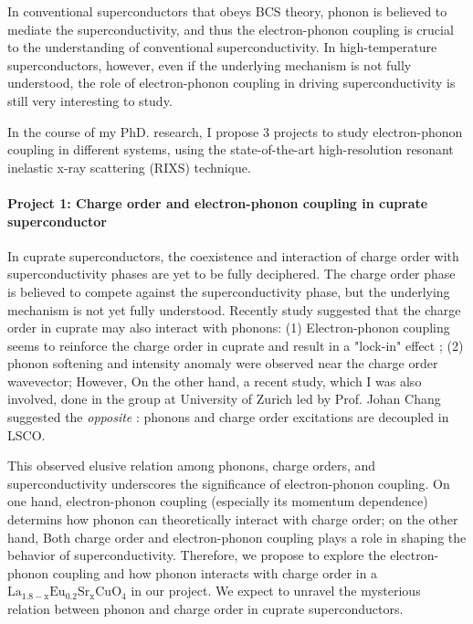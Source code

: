 \documentclass[11pt]{article}
\begin{document}
In conventional superconductors that obeys BCS theory, phonon is believed to mediate  the superconductivity\cite{bardeen_theory_1957}, and thus the electron-phonon coupling is crucial to the understanding of conventional superconductivity. In high-temperature superconductors, however, even if the underlying mechanism is not fully understood, the role of electron-phonon coupling in driving superconductivity is still very interesting to study.

In the course of my PhD. research, I propose 3 projects to study electron-phonon coupling in different systems, using the state-of-the-art high-resolution resonant inelastic x-ray scattering (RIXS) technique\cite{ament_resonant_2011,zhou_i21_2022}. 

\paragraph{Project 1: Charge order and electron-phonon coupling in cuprate superconductor}
In cuprate superconductors, the coexistence and interaction of charge order with superconductivity phases are yet to be fully deciphered. The charge order phase is believed to compete against the superconductivity phase\cite{arpaia_charge_2021,comin_resonant_2016,canosa_resonant_2014, hucker_competing_2014, chang_direct_2012,ghiringhelli_long-range_2012}, but the underlying mechanism is not yet fully understood. Recently study suggested that the charge order in cuprate may also interact with phonons: (1) Electron-phonon coupling seems to reinforce the charge order in cuprate and result in a "lock-in" effect \cite{wang_charge_2021}; (2) phonon softening and intensity anomaly were observed near the charge order wavevector\cite{wang_charge_2021,lin_strongly_2020, huang_quantum_2021,miao_incommensurate_2018,tacon_inelastic_2014,li_multiorbital_2020,braicovich_determining_2020,chaix_dispersive_2017,peng_enhanced_2020};  However, On the other hand, a recent study, which I was also involved, done in the group at University of Zurich led by Prof. Johan Chang suggested the \textit{opposite} : phonons and charge order excitations are decoupled in LSCO.

This observed elusive relation among phonons, charge orders, and superconductivity underscores the significance of electron-phonon coupling. On one hand, electron-phonon coupling (especially its momentum dependence) determins how phonon can theoretically interact with charge order; on the other hand, Both charge order and electron-phonon coupling plays a role in shaping the behavior of superconductivity. Therefore, we propose to explore the electron-phonon coupling and how phonon interacts with charge order in a $\mathrm{La_{1.8-x}Eu_{0.2}Sr_xCuO_{4}}$ in our project. We expect to unravel the mysterious relation between phonon and charge order in cuprate superconductors. 
\end{document}
